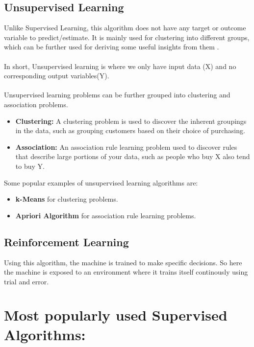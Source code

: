 \documentclass[Proceedings]{ascelike}
\begin{document}
\subsection{Unsupervised Learning}
 Unlike Supervised Learning, this algorithm does not have any target or outcome variable to predict/estimate.  It is mainly used for clustering into different groups, which can be further used for deriving some useful insights from them .\\
\\In short, Unsupervised learning is where we only have input data (X) and no corresponding output variables(Y).\\
\\Unsupervised learning problems can be further grouped into clustering and association problems.
\begin{itemize}
	\item \textbf{Clustering:} A clustering problem is used to discover the inherent groupings in the data, such as grouping customers based on their choice of purchasing. 
	\item \textbf{Association:}  An association rule learning problem used to discover rules that describe large portions of your data, such as people who buy X also tend to buy Y.
	 
\end{itemize}
Some popular examples of unsupervised learning algorithms are:
\begin{itemize}
	\item \textbf{k-Means} for clustering problems.
	\item \textbf{Apriori Algorithm} for association rule learning problems.
\end{itemize}

\subsection{Reinforcement Learning}
Using this algorithm, the machine is trained to make specific decisions. So here the machine is exposed to an environment where it trains itself continously using trial and error. %

\section{Most popularly used Supervised Algorithms:}
\end{document}
